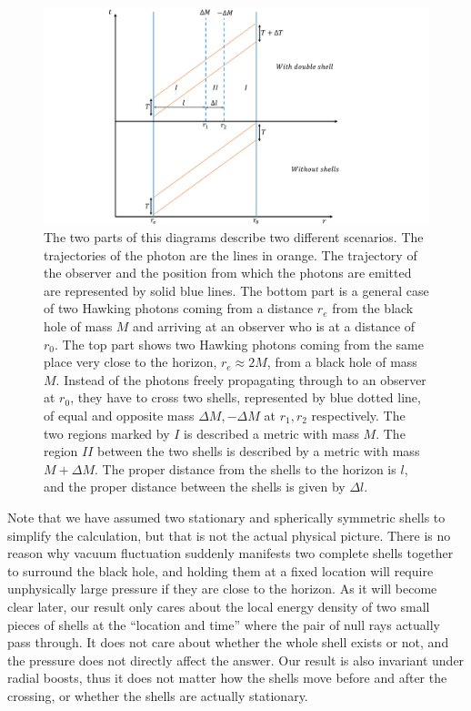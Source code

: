 \documentclass[aps,showpacs,onecolumn,floats,prd,superscriptaddress,nofootinbib]{revtex4-1}
\begin{document}
\begin{figure}[tb]
\begin{center}
\includegraphics[scale = 0.6]{Propertime.pdf}
\caption{The two parts of this diagrams describe two different scenarios. The trajectories of the photon are the lines in orange. The trajectory of the observer and the position from which the photons are emitted are represented by solid blue lines. The bottom part is a general case of two Hawking photons coming from a distance $r_e$ from the black hole of mass $M$ and arriving at an observer who is at a distance of $r_0$. The top part shows two Hawking photons coming from the same place very close to the horizon, $r_e\approx2M$, from a black hole of mass $M$. Instead of the photons freely propagating through to an observer at $r_0$, they have to cross two shells, represented by blue dotted line, of equal and opposite mass $\Delta M, -\Delta M$ at $r_{1}, r_{2}$ respectively. The two regions marked by $I$ is described a metric with mass $M$. The region $II$ between the two shells is described by a metric with mass $M+\Delta M$. The proper distance from the shells to the horizon is $l$, and the proper distance between the shells is given by $\Delta l$. }
\label{fig-setup}
\end{center}
\end{figure}

Note that we have assumed two stationary and spherically symmetric shells to simplify the calculation, but that is not the actual physical picture.
There is no reason why vacuum fluctuation suddenly manifests two complete shells together to surround the black hole, and holding them at a fixed location will require unphysically large pressure if they are close to the horizon.
As it will become clear later, our result only cares about the local energy density of two small pieces of shells at the ``location and time'' where the pair of null rays actually pass through.
It does not care about whether the whole shell exists or not, and the pressure does not directly affect the answer.
Our result is also invariant under radial boosts, thus it does not matter how the shells move before and after the crossing, or whether the shells are actually stationary.
\end{document}
